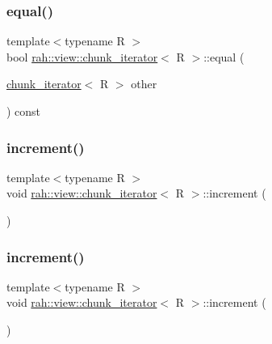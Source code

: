 \subsubsection{\texorpdfstring{equal()}{equal()}\hspace{0.1cm}{\footnotesize\ttfamily [2/2]}}
{\footnotesize\ttfamily template$<$typename R $>$ \\
bool \mbox{\hyperlink{structrah_1_1view_1_1chunk__iterator}{rah\+::view\+::chunk\+\_\+iterator}}$<$ R $>$\+::equal (\begin{DoxyParamCaption}\item[{\mbox{\hyperlink{structrah_1_1view_1_1chunk__iterator}{chunk\+\_\+iterator}}$<$ R $>$}]{other }\end{DoxyParamCaption}) const\hspace{0.3cm}{\ttfamily [inline]}}

\mbox{\label{structrah_1_1view_1_1chunk__iterator_a5159787ea568a933e219a9218daf3e61}} 
\subsubsection{\texorpdfstring{increment()}{increment()}\hspace{0.1cm}{\footnotesize\ttfamily [1/2]}}
{\footnotesize\ttfamily template$<$typename R $>$ \\
void \mbox{\hyperlink{structrah_1_1view_1_1chunk__iterator}{rah\+::view\+::chunk\+\_\+iterator}}$<$ R $>$\+::increment (\begin{DoxyParamCaption}{ }\end{DoxyParamCaption})\hspace{0.3cm}{\ttfamily [inline]}}

\mbox{\label{structrah_1_1view_1_1chunk__iterator_a5159787ea568a933e219a9218daf3e61}} 
\subsubsection{\texorpdfstring{increment()}{increment()}\hspace{0.1cm}{\footnotesize\ttfamily [2/2]}}
{\footnotesize\ttfamily template$<$typename R $>$ \\
void \mbox{\hyperlink{structrah_1_1view_1_1chunk__iterator}{rah\+::view\+::chunk\+\_\+iterator}}$<$ R $>$\+::increment (\begin{DoxyParamCaption}{ }\end{DoxyParamCaption})\hspace{0.3cm}{\ttfamily [inline]}}



